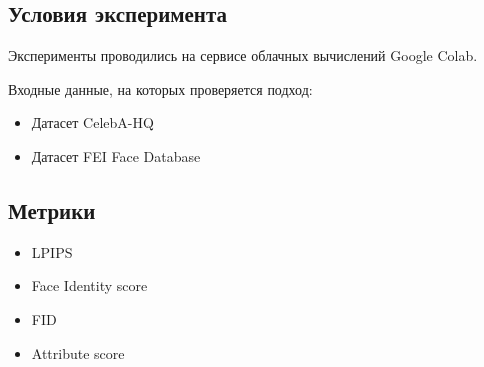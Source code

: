 
\subsection{Условия эксперимента}
Эксперименты проводились на сервисе облачных вычислений Google Colab.

Входные данные, на которых проверяется подход:
\begin{itemize}
\item Датасет CelebA-HQ
\item Датасет FEI Face Database
\end{itemize}


\subsection{Метрики}
\begin{itemize}
    \item LPIPS \cite{zhang2018lpips}
    \item Face Identity score \cite{deng2018arcface}
    \item FID \cite{heusel2017fid}
    \item Attribute score
\end{itemize}

